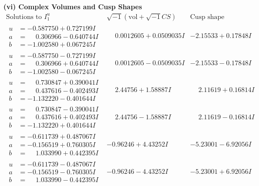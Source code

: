 \documentclass[1p]{elsarticle_modified}
\theoremstyle{definition}
\newcommand{\I}{\sqrt{-1}}
\begin{document}
\newpage\flushleft \textbf{(vi) Complex Volumes and Cusp Shapes}
$$\begin{array}{c|c|c}  
\text{Solutions to }I^u_{1}& \I (\text{vol} + \sqrt{-1}CS) & \text{Cusp shape}\\
 \hline 
\begin{aligned}
u &= -0.587750 + 0.727199 I \\
a &= \phantom{-}0.306966 - 0.640744 I \\
b &= -1.002580 + 0.067245 I\end{aligned}
 & \phantom{-}0.0012605 + 0.0509035 I & -2.15533 + 0.17848 I \\ \hline\begin{aligned}
u &= -0.587750 - 0.727199 I \\
a &= \phantom{-}0.306966 + 0.640744 I \\
b &= -1.002580 - 0.067245 I\end{aligned}
 & \phantom{-}0.0012605 - 0.0509035 I & -2.15533 - 0.17848 I \\ \hline\begin{aligned}
u &= \phantom{-}0.730847 + 0.390041 I \\
a &= \phantom{-}0.437616 - 0.402493 I \\
b &= -1.132220 - 0.401644 I\end{aligned}
 & \phantom{-}2.44756 + 1.58887 I & \phantom{-}2.11619 + 0.16814 I \\ \hline\begin{aligned}
u &= \phantom{-}0.730847 - 0.390041 I \\
a &= \phantom{-}0.437616 + 0.402493 I \\
b &= -1.132220 + 0.401644 I\end{aligned}
 & \phantom{-}2.44756 - 1.58887 I & \phantom{-}2.11619 - 0.16814 I \\ \hline\begin{aligned}
u &= -0.611739 + 0.487067 I \\
a &= -0.156519 + 0.760305 I \\
b &= \phantom{-}1.033990 + 0.442395 I\end{aligned}
 & -0.96246 + 4.43252 I & -5.23001 - 6.92056 I \\ \hline\begin{aligned}
u &= -0.611739 - 0.487067 I \\
a &= -0.156519 - 0.760305 I \\
b &= \phantom{-}1.033990 - 0.442395 I\end{aligned}
 & -0.96246 - 4.43252 I & -5.23001 + 6.92056 I \\ \hline\begin{aligned}

\end{aligned}
\end{array}$$
\end{document}
